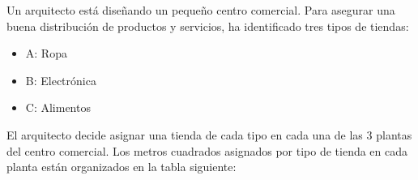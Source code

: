 \documentclass[addpoints,spanish, 12pt,a4paper]{exam}
\begin{document}
\begin{questions}


\newpage
\question Un arquitecto está diseñando un pequeño centro comercial. Para asegurar una buena distribución de productos y servicios, ha identificado tres tipos de tiendas:
\begin{itemize}
    \item A: Ropa
    \item B: Electrónica
    \item C: Alimentos
\end{itemize}
El arquitecto decide asignar una tienda de cada tipo en cada una de las 3 plantas del centro comercial. Los metros cuadrados asignados por tipo de tienda en cada planta están organizados en la tabla siguiente:


\end{questions}
\end{document}
